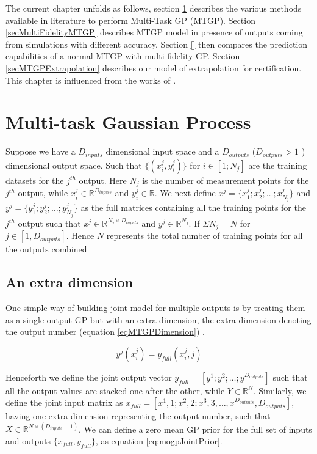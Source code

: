The current chapter unfolds as follows, section \ref{secMTGP} describes the various methods available in literature to perform Multi-Task GP (MTGP). Section \ref{secMultiFidelityMTGP} describes MTGP model in presence of outputs coming from simulations with different accuracy. Section \ref{} then compares the prediction capabilities of a normal MTGP with multi-fidelity GP. Section \ref{secMTGPExtrapolation} describes our model of extrapolation for certification. This chapter is influenced from the works of \cite{forrester2007multi, alvarez2011kernels, bonilla_multi-task_2008, Boyle05dependentgaussian, kennedy2000predicting, le2013multi}.

\section{Multi-task Gaussian Process}\label{secMTGP}
Suppose we have a \(D_{inputs}\) dimensional input space and a \(D_{outputs}\) (\(D_{outputs} > 1\) ) dimensional output space. Such that \(\{(x_{i}^{j}, y_{i}^{j})\}\) for \(i \in [1; N_{j}]\) are the training datasets for the \(j^{th}\) output. Here \(N_{j}\) is the number of measurement points for the \(j^{th}\) output, while \(x_{i}^{j} \in \mathbb{R}^{D_{inputs}}\) and \(y_{i}^{j} \in \mathbb{R}\). We next define \(x^{j} = \{x_{1}^{j}; x_{2}^{j}; \ldots ; x_{N_{j}}^{j}\}\) and \(y^{j} = \{y_{1}^{j}; y_{2}^{j}; \ldots ; y_{N_{j}}^{j}\}\) as the full matrices containing all the training points for the \(j^{th}\) output such that \(x^{j} \in \mathbb{R}^{N_{j} \times D_{inputs}}\) and \(y^{j} \in \mathbb{R}^{N_{j}}\). If \(\Sigma N_{j} = N\) for \(j \in [1, D_{outputs}]\). Hence \(N\) represents the total number of training points for all the outputs combined

\subsection{An extra dimension}\label{subsecAnExtraDimension}
One simple way of building joint model for multiple outputs is by treating them as a single-output GP but with an extra dimension, the extra dimension denoting the output number (equation \ref{eqMTGPDimension}) \cite{osborne2010bayesian}. 

\begin{equation}\label{eqMTGPDimension}
    y^{j}(x_{i}^{j}) = y_{full}(x_{i}^{j}, j)
\end{equation}

Henceforth we define the joint output vector \(y_{full} = [y^{1}; y^{2}; \ldots; y^{D_{outputs}}]\) such that all the output values are stacked one after the other, while \(Y \in \mathbb{R}^{N}\). Similarly, we define the joint input matrix as \(x_{full} = [x^{1}, 1; x^{2}, 2; x^{3}, 3, \ldots, x^{D_{outputs}}, D_{outputs}]\), having one extra dimension representing the output number, such that \(X \in \mathbb{R}^{N \times (D_{inputs}+1)}\). We can define a zero mean GP prior for the full set of inputs and outputs $\{x_{full}, y_{full}\}$, as equation \ref{eq:mogpJointPrior}.

